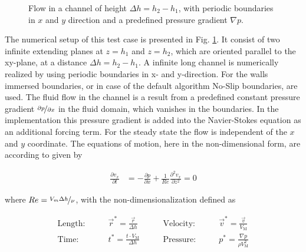 \begin{figure}[!bp]
  \begin{minipage}[c]{0.6\textwidth}
      \centering
  \end{minipage}
  \begin{minipage}[c]{0.3\textwidth}
      \caption{Flow in a channel of height $\Delta h = h_2 - h_1$, with periodic boundaries in $x$ and $y$ direction and
       a predefined pressure gradient $\nabla p$.
      \label{validation:setup_pf}
      }
  \end{minipage}
\end{figure}

The numerical setup of this test case is presented in Fig. \ref{validation:setup_pf}.
It consist of two infinite extending  planes at $z=h_1$ and $z=h_2$, which are oriented
parallel to the xy-plane, at a distance $\Delta h = h_2 - h_1$.
A infinite long channel is numerically realized by using periodic boundaries in x- and y-direction.
For the walls immersed boundaries, or in case of the default algorithm No-Slip boundaries, are used.
The fluid flow in the channel is a result from a predefined constant pressure gradient $\nicefrac{\partial p}{\partial x}$
in the fluid domain, which vanishes in the boundaries.
In the implementation this pressure gradient is added into the Navier-Stokes equation as an additional forcing term.
For the steady state the flow is independent of the $x$ and $y$ coordinate.
The equations of motion, here in the non-dimensional form, are according to \citep{Kundu2012} given by

\begin{align}
    \label{vali:pflow_navstok}
    \frac{\partial v_x}{\partial t} &= - \frac{\partial p}{\partial x}
     + \frac{1}{Re} \frac{\partial^2 v_x}{\partial z^2} = 0
\end{align}

where $Re = \nicefrac{V_{m}\Delta h}{\nu}$, with the non-dimensionalization defined as

\begin{align}
    \text{Length:}\qquad &  \vec{r}^* = \frac{\vec{r}}{\Delta h}  &
    \qquad \text{Velocity:}\qquad& \vec{v}^* =  \frac{\vec{v}}{V_{\text{M}}}\\
    \text{Time:}  \qquad & t^* = \frac{t \cdot V_\text{M}}{\Delta h}&
    \qquad  \text{Pressure:}\qquad & p^* = \frac{\nabla p}{\rho V_\text{M}^2}
\end{align}

